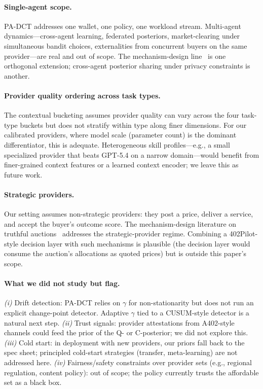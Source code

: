 \paragraph{Single-agent scope.}
PA-DCT addresses one wallet, one policy, one workload stream. Multi-agent dynamics—cross-agent learning, federated posteriors, market-clearing under simultaneous bandit choices, externalities from concurrent buyers on the same provider—are real and out of scope. The mechanism-design line~\citep{aamas2026reverseauction} is one orthogonal extension; cross-agent posterior sharing under privacy constraints is another.

\paragraph{Provider quality ordering across task types.}
The contextual bucketing assumes provider quality can vary across the four task-type buckets but does not stratify within type along finer dimensions. For our calibrated providers, where model scale (parameter count) is the dominant differentiator, this is adequate. Heterogeneous skill profiles—e.g., a small specialized provider that beats GPT-5.4 on a narrow domain—would benefit from finer-grained context features or a learned context encoder; we leave this as future work.

\paragraph{Strategic providers.}
Our setting assumes non-strategic providers: they post a price, deliver a service, and accept the buyer's outcome score. The mechanism-design literature on truthful auctions~\citep{aamas2026reverseauction} addresses the strategic-provider regime. Combining a 402Pilot-style decision layer with such mechanisms is plausible (the decision layer would consume the auction's allocations as quoted prices) but is outside this paper's scope.

\paragraph{What we did not study but flag.}
\emph{(i)} Drift detection: PA-DCT relies on $\gamma$ for non-stationarity but does not run an explicit change-point detector. Adaptive $\gamma$ tied to a CUSUM-style detector is a natural next step. \emph{(ii)} Trust signals: provider attestations from A402-style channels could feed the prior of the Q- or C-posterior; we did not explore this. \emph{(iii)} Cold start: in deployment with new providers, our priors fall back to the spec sheet; principled cold-start strategies (transfer, meta-learning) are not addressed here. \emph{(iv)} Fairness/safety constraints over provider sets (e.g., regional regulation, content policy): out of scope; the policy currently trusts the affordable set as a black box.
